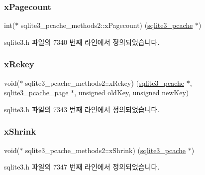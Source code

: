 \subsubsection{\texorpdfstring{x\+Pagecount}{xPagecount}}
{\footnotesize\ttfamily int($\ast$ sqlite3\+\_\+pcache\+\_\+methods2\+::x\+Pagecount) (\hyperlink{sqlite3_8h_a096c453d937d51f7926d7d31c8e0bd2f}{sqlite3\+\_\+pcache} $\ast$)}



sqlite3.\+h 파일의 7340 번째 라인에서 정의되었습니다.

\mbox{\label{structsqlite3__pcache__methods2_ad5b7609bdc0d2ae80325f7925b76c0af}} 
\subsubsection{\texorpdfstring{x\+Rekey}{xRekey}}
{\footnotesize\ttfamily void($\ast$ sqlite3\+\_\+pcache\+\_\+methods2\+::x\+Rekey) (\hyperlink{sqlite3_8h_a096c453d937d51f7926d7d31c8e0bd2f}{sqlite3\+\_\+pcache} $\ast$, \hyperlink{structsqlite3__pcache__page}{sqlite3\+\_\+pcache\+\_\+page} $\ast$, unsigned old\+Key, unsigned new\+Key)}



sqlite3.\+h 파일의 7343 번째 라인에서 정의되었습니다.

\mbox{\label{structsqlite3__pcache__methods2_a225971a193ff429d9f1339aca39c7755}} 
\subsubsection{\texorpdfstring{x\+Shrink}{xShrink}}
{\footnotesize\ttfamily void($\ast$ sqlite3\+\_\+pcache\+\_\+methods2\+::x\+Shrink) (\hyperlink{sqlite3_8h_a096c453d937d51f7926d7d31c8e0bd2f}{sqlite3\+\_\+pcache} $\ast$)}



sqlite3.\+h 파일의 7347 번째 라인에서 정의되었습니다.

\mbox{\label{structsqlite3__pcache__methods2_a4285fc03adf01cbd3283644a1072ffef}} 
